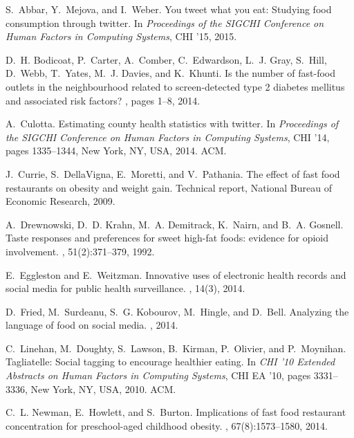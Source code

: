 \documentclass{sig-alternate-2013}
\begin{document}
\begin{thebibliography}{10}

S.~Abbar, Y.~Mejova, and I.~Weber.
\newblock You tweet what you eat: Studying food consumption through twitter.
\newblock In {\em Proceedings of the SIGCHI Conference on Human Factors in
  Computing Systems}, CHI '15, 2015.

D.~H. Bodicoat, P.~Carter, A.~Comber, C.~Edwardson, L.~J. Gray, S.~Hill,
  D.~Webb, T.~Yates, M.~J. Davies, and K.~Khunti.
\newblock Is the number of fast-food outlets in the neighbourhood related to
  screen-detected type 2 diabetes mellitus and associated risk factors?
, pages 1--8, 2014.

A.~Culotta.
\newblock Estimating county health statistics with twitter.
\newblock In {\em Proceedings of the SIGCHI Conference on Human Factors in
  Computing Systems}, CHI '14, pages 1335--1344, New York, NY, USA, 2014. ACM.

J.~Currie, S.~DellaVigna, E.~Moretti, and V.~Pathania.
\newblock The effect of fast food restaurants on obesity and weight gain.
\newblock Technical report, National Bureau of Economic Research, 2009.

A.~Drewnowski, D.~D. Krahn, M.~A. Demitrack, K.~Nairn, and B.~A. Gosnell.
\newblock Taste responses and preferences for sweet high-fat foods: evidence
  for opioid involvement.
, 51(2):371--379, 1992.

E.~Eggleston and E.~Weitzman.
\newblock Innovative uses of electronic health records and social media for
  public health surveillance.
, 14(3), 2014.

D.~Fried, M.~Surdeanu, S.~G. Kobourov, M.~Hingle, and D.~Bell.
\newblock Analyzing the language of food on social media.
, 2014.

C.~Linehan, M.~Doughty, S.~Lawson, B.~Kirman, P.~Olivier, and P.~Moynihan.
\newblock Tagliatelle: Social tagging to encourage healthier eating.
\newblock In {\em CHI '10 Extended Abstracts on Human Factors in Computing
  Systems}, CHI EA '10, pages 3331--3336, New York, NY, USA, 2010. ACM.

C.~L. Newman, E.~Howlett, and S.~Burton.
\newblock Implications of fast food restaurant concentration for preschool-aged
  childhood obesity.
, 67(8):1573--1580, 2014.


\end{thebibliography}
\end{document}
